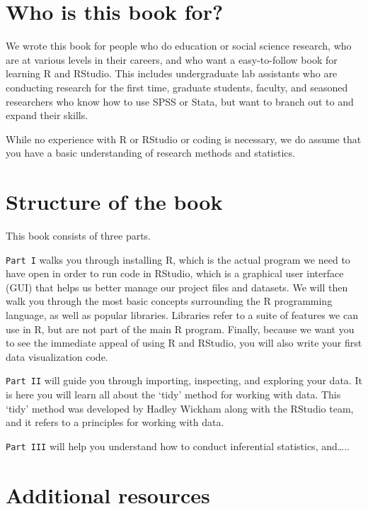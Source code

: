 \documentclass[
]{book}
\begin{document}
\hypertarget{who-is-this-book-for}{%
\section{Who is this book for?}\label{who-is-this-book-for}}

We wrote this book for people who do education or social science research, who are at various levels in their careers, and who want a easy-to-follow book for learning R and RStudio. This includes undergraduate lab assistants who are conducting research for the first time, graduate students, faculty, and seasoned researchers who know how to use SPSS or Stata, but want to branch out to and expand their skills.

While no experience with R or RStudio or coding is necessary, we do assume that you have a basic understanding of research methods and statistics.

\hypertarget{structure-of-the-book}{%
\section{Structure of the book}\label{structure-of-the-book}}

This book consists of three parts.

\texttt{Part\ I} walks you through installing R, which is the actual program we need to have open in order to run code in RStudio, which is a graphical user interface (GUI) that helps us better manage our project files and datasets. We will then walk you through the most basic concepts surrounding the R programming language, as well as popular libraries. Libraries refer to a suite of features we can use in R, but are not part of the main R program. Finally, because we want you to see the immediate appeal of using R and RStudio, you will also write your first data visualization code.

\texttt{Part\ II} will guide you through importing, inspecting, and exploring your data. It is here you will learn all about the `tidy' method for working with data. This `tidy' method was developed by Hadley Wickham along with the RStudio team, and it refers to a principles for working with data.

\texttt{Part\ III} will help you understand how to conduct inferential statistics, and\ldots..

\hypertarget{additional-resources}{%
\section{Additional resources}\label{additional-resources}}
\end{document}

